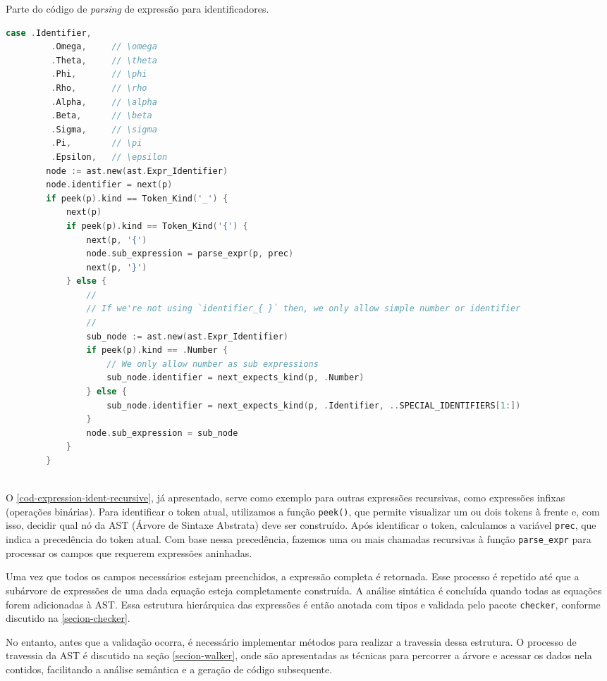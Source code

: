 \begin{codigo}[htb]
    \caption{\small Parte do código de \textit{parsing} de expressão para identificadores. }
        \label{cod-expression-ident-recursive}
  \begin{lstlisting}[language = C]
    case .Identifier,
         .Omega,     // \omega
         .Theta,     // \theta
         .Phi,       // \phi
         .Rho,       // \rho
         .Alpha,     // \alpha
         .Beta,      // \beta
         .Sigma,     // \sigma
         .Pi,        // \pi
         .Epsilon,   // \epsilon
        node := ast.new(ast.Expr_Identifier)
        node.identifier = next(p)
        if peek(p).kind == Token_Kind('_') {
            next(p)
            if peek(p).kind == Token_Kind('{') {
                next(p, '{')
                node.sub_expression = parse_expr(p, prec)
                next(p, '}')
            } else {
                //
                // If we're not using `identifier_{ }` then, we only allow simple number or identifier
                //
                sub_node := ast.new(ast.Expr_Identifier)
                if peek(p).kind == .Number {
                    // We only allow number as sub expressions
                    sub_node.identifier = next_expects_kind(p, .Number)
                } else {
                    sub_node.identifier = next_expects_kind(p, .Identifier, ..SPECIAL_IDENTIFIERS[1:])
                }
                node.sub_expression = sub_node
            }
        }
    
  \end{lstlisting}
\end{codigo}


O \autoref{cod-expression-ident-recursive}, já apresentado, serve como exemplo para outras expressões recursivas, como expressões infixas (operações binárias). Para identificar o token atual, utilizamos a função \texttt{peek()}, que permite visualizar um ou dois tokens à frente e, com isso, decidir qual nó da AST (Árvore de Sintaxe Abstrata) deve ser construído. Após identificar o token, calculamos a variável \texttt{prec}, que indica a precedência do token atual. Com base nessa precedência, fazemos uma ou mais chamadas recursivas à função \texttt{parse\_expr} para processar os campos que requerem expressões aninhadas.

Uma vez que todos os campos necessários estejam preenchidos, a expressão completa é retornada. Esse processo é repetido até que a subárvore de expressões de uma dada equação esteja completamente construída. A análise sintática é concluída quando todas as equações forem adicionadas à AST. Essa estrutura hierárquica das expressões é então anotada com tipos e validada pelo pacote \texttt{checker}, conforme discutido na \autoref{secion-checker}.

No entanto, antes que a validação ocorra, é necessário implementar métodos para realizar a travessia dessa estrutura. O processo de travessia da AST é discutido na seção \autoref{secion-walker}, onde são apresentadas as técnicas para percorrer a árvore e acessar os dados nela contidos, facilitando a análise semântica e a geração de código subsequente.

